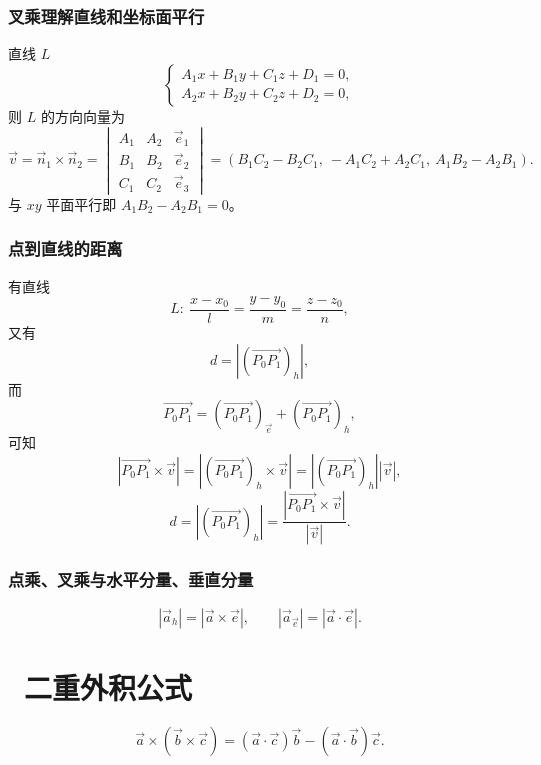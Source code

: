 \documentclass[UTF8,11pt]{ctexart}
\theoremstyle{cnthm}
\begin{document}
\subsubsection*{叉乘理解直线和坐标面平行}

直线 $L$
\[
\begin{cases}
A_1x+B_1y+C_1z+D_1=0,\\
A_2x+B_2y+C_2z+D_2=0,
\end{cases}
\]
则 $L$ 的方向向量为
\[
\vec v=\vec n_1\times\vec n_2
=\begin{vmatrix}
A_1 & A_2 & \vec e_1\\
B_1 & B_2 & \vec e_2\\
C_1 & C_2 & \vec e_3
\end{vmatrix}
=(B_1C_2-B_2C_1,\ -A_1C_2+A_2C_1,\ A_1B_2-A_2B_1).
\]
与 $xy$ 平面平行即 $A_1B_2-A_2B_1=0$。

\subsubsection*{点到直线的距离}

有直线
\[
L:\ \frac{x-x_0}{l}=\frac{y-y_0}{m}=\frac{z-z_0}{n},
\]
又有
\[
d=|(\overrightarrow{P_0P_1})_h|,
\]
而
\[
\overrightarrow{P_0P_1}
=(\overrightarrow{P_0P_1})_{\vec e}
+(\overrightarrow{P_0P_1})_h,
\]
可知
\[
|\overrightarrow{P_0P_1}\times\vec v|
=|(\overrightarrow{P_0P_1})_h\times\vec v|
=|(\overrightarrow{P_0P_1})_h||\vec v|,
\]
\[
d=|(\overrightarrow{P_0P_1})_h|
=\frac{|\overrightarrow{P_0P_1}\times\vec v|}{|\vec v|}.
\]

\subsubsection*{点乘、叉乘与水平分量、垂直分量}

\[
|\vec a_h|=|\vec a\times\vec e|,\qquad
|\vec a_{\vec e}|=|\vec a\cdot\vec e| .
\]

\section{\ 二重外积公式}

\[
\vec a\times(\vec b\times\vec c)
=(\vec a\cdot\vec c)\vec b-(\vec a\cdot\vec b)\vec c .
\]
\end{document}
